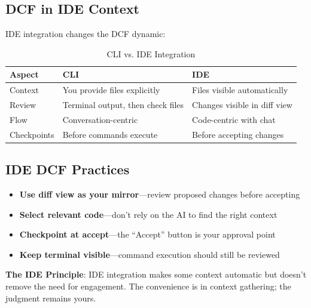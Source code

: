 \subsection{DCF in IDE Context}

IDE integration changes the DCF dynamic:

\begin{table}[H]
\centering
\begin{tabular}{lll}
\toprule
\textbf{Aspect} & \textbf{CLI} & \textbf{IDE} \\
\midrule
Context & You provide files explicitly & Files visible automatically \\
Review & Terminal output, then check files & Changes visible in diff view \\
Flow & Conversation-centric & Code-centric with chat \\
Checkpoints & Before commands execute & Before accepting changes \\
\bottomrule
\end{tabular}
\caption{CLI vs. IDE Integration}
\end{table}

\subsection{IDE DCF Practices}

\begin{itemize}
    \item \textbf{Use diff view as your mirror}---review proposed changes before accepting
    \item \textbf{Select relevant code}---don't rely on the AI to find the right context
    \item \textbf{Checkpoint at accept}---the ``Accept'' button is your approval point
    \item \textbf{Keep terminal visible}---command execution should still be reviewed
\end{itemize}

\textbf{The IDE Principle}: IDE integration makes some context automatic but doesn't remove the need for engagement. The convenience is in context gathering; the judgment remains yours.

